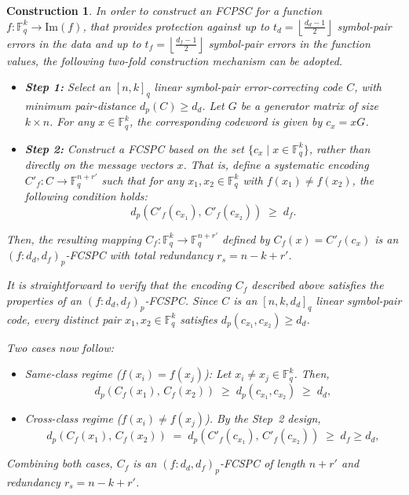 \documentclass[11pt,draftclsnofoot,journal,onecolumn]{IEEEtran}
\newtheorem{construction}{Construction}
\begin{document}
    \begin{construction}
    \label{construction-2-step}
    In order to construct an FCPSC for a function $f: \mathbb{F}_q^k \to \mathrm{Im}(f)$, that provides protection against up to $t_d = \left\lfloor \frac{d_d-1}{2} \right\rfloor$ symbol-pair errors in the data and up to $t_f = \left\lfloor \frac{d_f-1}{2} \right\rfloor$ symbol-pair errors in the function values, the following two-fold construction mechanism can be adopted.
    
    \begin{itemize}
    \item \textbf{Step 1:} Select an $[n,k]_q$ linear symbol-pair error-correcting code $C$, with minimum pair-distance $d_p(C) \geq d_d$. Let $G$ be a generator matrix of size $k \times n$. For any $x \in \mathbb{F}_q^k$, the corresponding codeword is given by $c_x = xG$.

    \item \textbf{Step 2:} Construct a FCSPC based on the set $\{c_x \mid x \in \mathbb{F}_q^k\}$, rather than directly on the message vectors $x$. That is, define a systematic encoding $C'_f : C \to \mathbb{F}_q^{n+r'}$ such that for any $x_1, x_2 \in \mathbb{F}_q^k$ with $f(x_1) \neq f(x_2)$, the following condition holds:
    \[
        d_p\!\left( C'_f(c_{x_1}),\, C'_f(c_{x_2}) \right) \;\geq\; d_f.
    \]
    \end{itemize}
    
    Then, the resulting mapping $C_f : \mathbb{F}_q^k \to \mathbb{F}_q^{n+r'}$ defined by $C_f(x) = C'_f(c_x)$ is an $(f : d_d, d_f)_p$-FCSPC with total redundancy $r_s = n - k + r'$.

    It is straightforward to verify that the encoding $C_f$ described above satisfies the properties of an $(f: d_d, d_f)_p$-FCSPC. Since $C$ is an $[n,k,d_d]_q$ linear symbol-pair code, every distinct pair $x_1, x_2 \in \mathbb{F}_q^k$ satisfies $d_p(c_{x_1}, c_{x_2}) \geq d_d$. 
    
    Two cases now follow:
    \begin{itemize}
    \item {Same-class regime} ($f(x_i) = f(x_j)$): Let $x_i \neq x_j \in \mathbb{F}_q^k$. Then,
    \[
        d_p\!\left( C_f(x_1),\, C_f(x_2) \right) \;\geq\;d_p(c_{x_1}, c_{x_2})  \;\geq\; d_d,
    \]

    \item {Cross-class regime} ($f(x_i) \neq f(x_j)$). By the Step~2 design,
    \[
        d_p\!\left( C_f(x_1),\, C_f(x_2) \right) \;=\; d_p\!\left( C'_f(c_{x_1}),\, C'_f(c_{x_2}) \right) \;\geq\; d_f \geq d_d,
    \]
    \end{itemize}
    Combining both cases, $C_f$ is an $(f: d_d, d_f)_p$-FCSPC of length $n + r'$ and redundancy $r_s = n - k + r'$.
    \end{construction}
\end{document}
